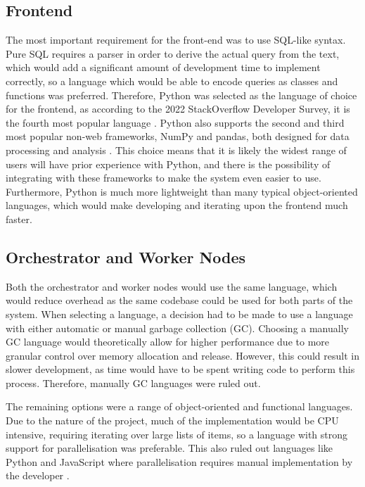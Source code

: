 \subsection{Frontend}\label{subsec:frontend-design}
The most important requirement for the front-end was to use SQL-like syntax. Pure SQL requires a parser in order to derive the actual query from the text, which would add a significant amount of development time to implement correctly, so a language which would be able to encode queries as classes and functions was preferred.
Therefore, Python was selected as the language of choice for the frontend, as according to the 2022 StackOverflow Developer Survey, it is the fourth most popular language \cite{stackoverflowsurvey2022}. Python also supports the second and third most popular non-web frameworks, NumPy and pandas, both designed for data processing and analysis \cite{reback2020pandas, harris2020array}. This choice means that it is likely the widest range of users will have prior experience with Python, and there is the possibility of integrating with these frameworks to make the system even easier to use. Furthermore, Python is much more lightweight than many typical object-oriented languages, which would make developing and iterating upon the frontend much faster.

\subsection{Orchestrator and Worker Nodes}
Both the orchestrator and worker nodes would use the same language, which would reduce overhead as the same codebase could be used for both parts of the system. When selecting a language, a decision had to be made to use a language with either automatic or manual garbage collection (GC). Choosing a manually GC language would theoretically allow for higher performance due to more granular control over memory allocation and release. However, this could result in slower development, as time would have to be spent writing code to perform this process. Therefore, manually GC languages were ruled out.

The remaining options were a range of object-oriented and functional languages. Due to the nature of the project, much of the implementation would be CPU intensive, requiring iterating over large lists of items, so a language with strong support for parallelisation was preferable. This also ruled out languages like Python and JavaScript where parallelisation requires manual implementation by the developer \cite{pythonmultiprocessing, nodeworkerthreads}.


